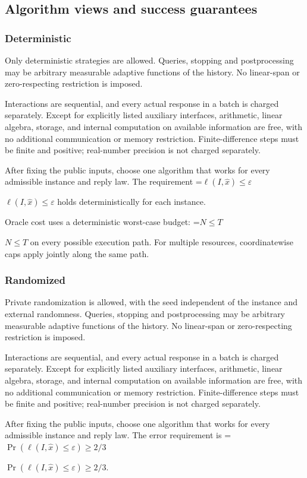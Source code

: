 \documentclass[10pt,a4paper]{article}
\newcommand{\AtlasMath}[1]{\par\begingroup\centering\setbox0=\hbox{$\displaystyle #1$}\ifdim\wd0>1.4\linewidth\typeout{ATLAS WIDE FORMULA: \the\wd0}\fi\ifdim\wd0>\linewidth\resizebox{\linewidth}{!}{\box0}\else\box0\fi\par\endgroup}
\newcommand{\AtlasInlineMath}[1]{\begingroup\setbox0=\hbox{$#1$}\ifdim\wd0>.4\linewidth\endgroup\AtlasMath{#1}\else\endgroup$#1$\fi}
\begin{document}
\subsection{Algorithm views and success guarantees}
\subsubsection{Deterministic}
Only deterministic strategies are allowed. Queries, stopping and postprocessing may be arbitrary measurable adaptive functions of the history. No linear-span or zero-respecting restriction is imposed.

Interactions are sequential, and every actual response in a batch is charged separately. Except for explicitly listed auxiliary interfaces, arithmetic, linear algebra, storage, and internal computation on available information are free, with no additional communication or memory restriction. Finite-difference steps must be finite and positive; real-number precision is not charged separately.

After fixing the public inputs, choose one algorithm that works for every admissible instance and reply law. The requirement \AtlasInlineMath{\ell(I,\widehat{x})\le \varepsilon} holds deterministically for each instance.

Oracle cost uses a deterministic worst-case budget: \AtlasInlineMath{N\le T} on every possible execution path. For multiple resources, coordinatewise caps apply jointly along the same path.

\subsubsection{Randomized}
Private randomization is allowed, with the seed independent of the instance and external randomness. Queries, stopping and postprocessing may be arbitrary measurable adaptive functions of the history. No linear-span or zero-respecting restriction is imposed.

Interactions are sequential, and every actual response in a batch is charged separately. Except for explicitly listed auxiliary interfaces, arithmetic, linear algebra, storage, and internal computation on available information are free, with no additional communication or memory restriction. Finite-difference steps must be finite and positive; real-number precision is not charged separately.

After fixing the public inputs, choose one algorithm that works for every admissible instance and reply law. The error requirement is \AtlasInlineMath{\Pr(\ell(I,\widehat{x})\le \varepsilon)\ge2/3}.
\end{document}
